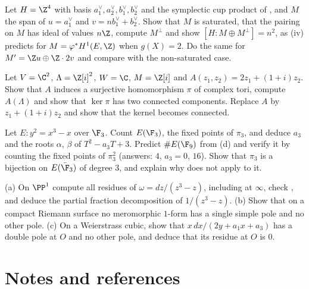 \begin{exercise}\label{ex:curves:ex-gram}
Let $H=\Z^4$ with basis $a_1^\vee,a_2^\vee,b_1^\vee,b_2^\vee$ and the symplectic cup product of , and $M$ the span of $u=a_1^\vee$ and $v=nb_1^\vee+b_2^\vee$. Show
that $M$ is saturated, that the pairing on $M$ has ideal of values $n\Z$, compute $M^\perp$ and show $[H:M\oplus M^\perp]=n^2$, as (iv) predicts for
$M=\varphi^*H^1(E,\Z)$ when $g(X)=2$. Do the same for $M'=\Z u\oplus\Z\cdot2v$ and compare with the non-saturated case.
\end{exercise}

\begin{exercise}\label{ex:curves:ex-component}
Let $V=\C^2$, $\Lambda=\Z[i]^2$, $W=\C$, $M=\Z[i]$ and $A(z_1,z_2)=2z_1+(1+i)z_2$. Show that $A$ induces a surjective homomorphism $\pi$ of complex tori, compute $A(\Lambda)$ and show that
$\ker\pi$ has two connected components. Replace $A$ by $z_1+(1+i)z_2$ and show that the kernel becomes connected.
\end{exercise}

\begin{exercise}\label{ex:curves:ex-frobenius}
Let $E\colon y^2=x^3-x$ over $\F_3$. Count $E(\F_3)$, the fixed points of $\pi_3$, and deduce $a_3$ and the roots $\alpha$, $\beta$ of $T^2-a_3T+3$. Predict $\#E(\F_9)$ from
(d) and verify it by counting the fixed points of $\pi_3^2$ (answers: $4$, $a_3=0$, $16$). Show that $\pi_3$ is a bijection on $E(\bar\F_3)$ of degree $3$,
and explain why  does not apply to it.
\end{exercise}

\begin{exercise}\label{ex:curves:ex-residue}
(a) On $\PP^1$ compute all residues of $\omega=dz/(z^3-z)$, including at $\infty$, check , and deduce the partial fraction decomposition of $1/(z^3-z)$. (b) Show that on a
compact Riemann surface no meromorphic $1$-form has a single simple pole and no other pole. (c) On a Weierstrass cubic, show that $x\,dx/(2y+a_1x+a_3)$ has a double pole at $O$ and no other pole,
and deduce that its residue at $O$ is $0$.
\end{exercise}

\section{Notes and references}\label{sec:curves:notes}

